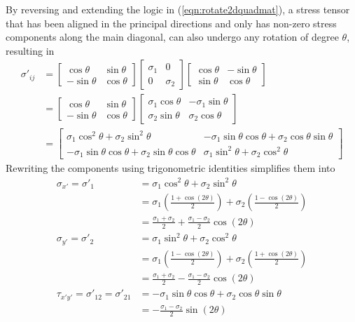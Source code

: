 By reversing and extending the logic in (\ref{eqn:rotate2dquadmat}), a stress tensor that has been aligned in the principal directions and only has non-zero stress components along the main diagonal, can also undergo any rotation of degree $\theta$, resulting in
\begin{align}
\sigma'_{ij} &= 
\begin{bmatrix}
\cos \theta & \sin \theta \\
-\sin \theta & \cos \theta
\end{bmatrix}
\begin{bmatrix}
\sigma_1 & 0 \\
0 & \sigma_2 
\end{bmatrix}
\begin{bmatrix}
\cos \theta & -\sin \theta \\
\sin \theta & \cos \theta
\end{bmatrix} \nonumber \\
&=
\begin{bmatrix}
\cos \theta & \sin \theta \\
-\sin \theta & \cos \theta
\end{bmatrix}
\begin{bmatrix}
\sigma_1\cos \theta & -\sigma_1\sin \theta \\
\sigma_2\sin \theta & \sigma_2\cos \theta
\end{bmatrix} \nonumber \\
&=
\begin{bmatrix}
\sigma_1\cos^2 \theta + \sigma_2\sin^2\theta & -\sigma_1\sin \theta \cos\theta + \sigma_2\cos \theta\sin\theta \\
-\sigma_1\sin \theta\cos\theta + \sigma_2\sin\theta\cos\theta & \sigma_1\sin^2\theta + \sigma_2\cos^2 \theta
\end{bmatrix}
\end{align}
Rewriting the components using trigonometric identities simplifies them into
\begin{subequations}
\begin{align}
\sigma_{x'} = \sigma'_1 &= \sigma_1\cos^2 \theta + \sigma_2\sin^2\theta \nonumber \\
&= \sigma_1\left(\frac{1+\cos(2\theta)}{2}\right) + \sigma_2\left(\frac{1-\cos(2\theta)}{2}\right) \nonumber \\
&= \frac{\sigma_1 + \sigma_2}{2} + \frac{\sigma_1 - \sigma_2}{2}\cos(2\theta) \label{eqn:mohrnormal1} \\
\sigma_{y'} = \sigma'_2 &= \sigma_1\sin^2 \theta + \sigma_2\cos^2\theta \nonumber \\
&= \sigma_1\left(\frac{1-\cos(2\theta)}{2}\right) + \sigma_2\left(\frac{1+\cos(2\theta)}{2}\right) \nonumber \\
&= \frac{\sigma_1 + \sigma_2}{2} - \frac{\sigma_1 - \sigma_2}{2}\cos(2\theta) \label{eqn:mohrnormal2} \\
\tau_{x'y'} = \sigma'_{12} = \sigma'_{21} &= -\sigma_1\sin \theta \cos\theta + \sigma_2\cos \theta\sin\theta \nonumber \\
&= -\frac{\sigma_1 - \sigma_2}{2} \sin(2\theta) \label{eqn:mohrshear}
\end{align} 
\end{subequations}

